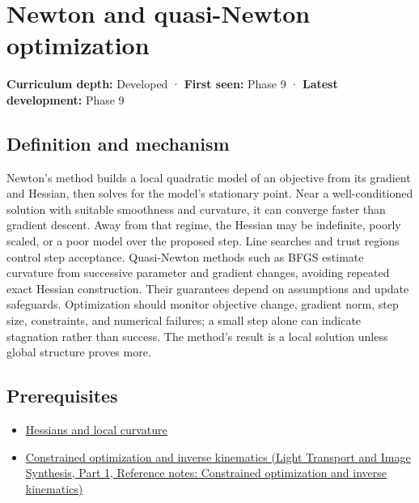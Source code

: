 \hypertarget{appendix-54c8f5828387}{}\label{referencestart:appendix-54c8f5828387}
\section{Newton and quasi-Newton optimization}\label{appendix-54c8f5828387-newton-and-quasi-newton-optimization}

\hypertarget{appendix-54c8f5828387-newton-and-quasi-newton-optimization}{}

\textbf{Curriculum depth:} Developed · \textbf{First seen:} Phase 9 · \textbf{Latest development:} Phase 9

\begin{allmightroledefinition}

\subsection{Definition and mechanism}\label{appendix-54c8f5828387-definition-and-mechanism}

\hypertarget{appendix-54c8f5828387-definition-and-mechanism}{}

Newton's method builds a local quadratic model of an objective from its gradient and Hessian, then solves for the model's stationary point. Near a well-conditioned solution with suitable smoothness and curvature, it can converge faster than gradient descent. Away from that regime, the Hessian may be indefinite, poorly scaled, or a poor model over the proposed step. Line searches and trust regions control step acceptance. Quasi-Newton methods such as BFGS estimate curvature from successive parameter and gradient changes, avoiding repeated exact Hessian construction. Their guarantees depend on assumptions and update safeguards. Optimization should monitor objective change, gradient norm, step size, constraints, and numerical failures; a small step alone can indicate stagnation rather than success. The method's result is a local solution unless global structure proves more.

\end{allmightroledefinition}

\subsection{Prerequisites}\label{appendix-54c8f5828387-prerequisites}

\hypertarget{appendix-54c8f5828387-prerequisites}{}

\begin{itemize}
\tightlist
\item
  \hyperref[appendix-6ac071f8b50c]{Hessians and local curvature}
\item
  \href{../04-Light-Transport-and-Image-Synthesis-P01/main.pdf\#nameddest=appendix-29f4bea4c2bb}{Constrained optimization and inverse kinematics (Light Transport and Image Synthesis, Part 1, Reference notes: Constrained optimization and inverse kinematics)}
\end{itemize}

